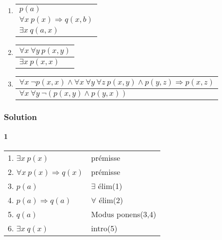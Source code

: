 \begin{enumerate}
	\item \enter
\begin{flushleft}
\begin{tabular}{l}
$p(a)$ \\
$\forall x \ p(x) \Rightarrow q(x, b)$ \\
\hline
$\exists x \ q(a, x)$
\end{tabular}
\end{flushleft}

	\item \enter
\begin{flushleft}
\begin{tabular}{l}
$\forall x \ \forall y \ p(x, y)$ \\
\hline
$\exists x \ p(x, x)$
\end{tabular}
\end{flushleft}

	\item \enter
\begin{flushleft}
\begin{tabular}{l}
$\forall x \ \neg p(x, x) \land \forall x \ \forall y \ \forall z \ p(x, y) \land p(y, z) \Rightarrow p(x, z)$ \\
\hline
$\forall x \ \forall y \ \neg (p(x, y) \land p(y, x))$
\end{tabular}
\end{flushleft}

\end{enumerate}


    \subsubsection*{Solution}
    
        \paragraph{1}
        
            \begin{tabular}{|l|l|}
            \hline
            1. $\exists x \  p(x)$ & prémisse \\
            2. $\forall x \  p(x) \Rightarrow q(x)$ & prémisse \\
            3. $p(a)$ & $\exists$ élim(1) \\
            4. $p(a) \Rightarrow q(a)$ & $\forall$ élim(2) \\ 
            5. $q(a)$ & Modus ponens(3,4) \\
            6. $\exists x \  q(x)$ & intro(5) \\
            \hline
            \end{tabular}
        
